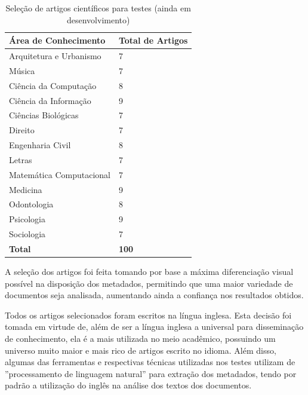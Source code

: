 \begin{table}
    \caption{Seleção de artigos científicos para testes (ainda em desenvolvimento)}
    \begin{center}
        \begin{tabular}{|l|l|}
            \hline
            \textbf{Área de Conhecimento} & \textbf{Total de Artigos} \\ 
            \hline
            Arquitetura e Urbanismo & 7 \\ 
            Música & 7 \\ 
            Ciência da Computação & 8 \\
            Ciência da Informação & 9 \\
            Ciências Biológicas & 7 \\
            Direito & 7 \\
            Engenharia Civil & 8 \\
            Letras & 7 \\
            Matemática Computacional & 7 \\
            Medicina & 9 \\ 
            Odontologia & 8 \\ 
            Psicologia & 9 \\
            Sociologia & 7 \\   
            \hline
            \textbf{Total} & \textbf{100} \\
            \hline 
        \end{tabular}
    \end{center}
    \label{tab:papers-list}
\end{table}

\begin{textedited}
A seleção dos artigos foi feita tomando por base a máxima diferenciação visual possível na disposição dos metadados, permitindo que uma maior variedade de documentos seja analisada, aumentando ainda a confiança nos resultados obtidos.
\end{textedited}


\begin{textedited}
Todos os artigos selecionados foram escritos na língua inglesa. Esta decisão foi tomada em virtude de, além de ser a língua inglesa a universal para disseminação de conhecimento, ela é a mais utilizada no meio acadêmico, possuindo um universo muito maior e mais rico de artigos escrito no idioma. Além disso, algumas das ferramentas e respectivas técnicas utilizadas nos testes utilizam de ''processamento de linguagem natural'' para extração dos metadados, tendo por padrão a utilização do inglês na análise dos textos dos documentos.
\end{textedited}

